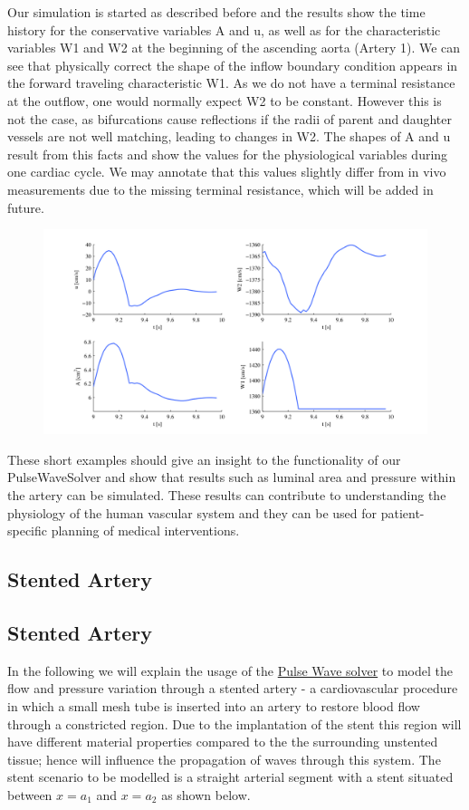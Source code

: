 Our simulation is started as described before and the results show the time
history for the conservative variables A and u, as well as for the
characteristic variables W1 and W2 at the beginning of the ascending aorta
(Artery 1). We can see that physically correct the shape of the inflow boundary
condition appears in the forward traveling characteristic W1. As we do not have
a terminal resistance at the outflow, one would normally expect W2 to be
constant. However this is not the case, as bifurcations cause reflections if the
radii of parent and daughter vessels are not well matching, leading to changes
in W2. The shapes of A and u result from this facts and show the values for the
physiological variables during one cardiac cycle. We may annotate that this
values slightly differ from in vivo measurements due to the missing terminal
resistance, which will be added in future.

\begin{figure}
	\includegraphics[width=\linewidth]{Figures/Network_Results.png}
\end{figure}

These short examples should give an insight to the functionality of our
PulseWaveSolver and show that results such as luminal area and pressure within
the artery can be simulated. These results can contribute to understanding the
physiology of the human vascular system and they can be used for
patient-specific planning of medical interventions.



\subsection{Stented Artery}
\subsection{Stented Artery}
In the following we will explain the usage of the  \hyperref[PulseWaveSolver]{Pulse Wave solver} to model the flow and pressure variation through a stented artery - a cardiovascular procedure in which a small mesh tube is inserted into an artery to restore blood flow through a constricted region. Due to the implantation of the stent this region will have different material properties compared to the the surrounding unstented tissue; hence will influence the propagation of waves through this system. The stent scenario to be modelled is a straight arterial segment with a stent situated between $x=a_{1}$ and $x=a_{2}$ as shown below.

